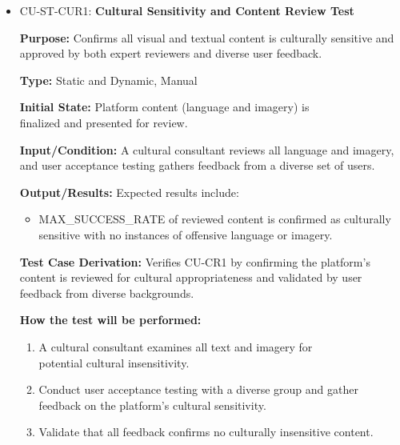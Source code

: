 \documentclass[12pt, titlepage]{article}
\begin{document}
\begin{itemize} 

  \item CU-ST-CUR1: \textbf{Cultural Sensitivity and Content Review Test}
  \begin{mdframed}[linewidth=0.5mm] 
    \textbf{Purpose:} Confirms all visual and textual content is culturally sensitive and approved by both expert reviewers and diverse user feedback. \par
    \textbf{Type:} Static and Dynamic, Manual \par 
    \textbf{Initial State:} Platform content (language and imagery) is \\finalized and presented for review. \par 
    \textbf{Input/Condition:} A cultural consultant reviews all language and imagery, and user acceptance testing gathers feedback from a diverse set of users. \par 
    \textbf{Output/Results:} Expected results include: 
    \begin{itemize} 
      \item MAX\_SUCCESS\_RATE of reviewed content is confirmed as culturally sensitive with no instances of offensive language or imagery. 
    \end{itemize} \par 
    \textbf{Test Case Derivation:} Verifies CU-CR1 by confirming the platform’s content is reviewed for cultural appropriateness and validated by user feedback from diverse backgrounds. \par 
    \textbf{How the test will be performed:} 
    \begin{enumerate}[noitemsep] 
      \item A cultural consultant examines all text and imagery for \\potential cultural insensitivity. 
      \item Conduct user acceptance testing with a diverse group and gather feedback on the platform's cultural sensitivity. 
      \item Validate that all feedback confirms no culturally insensitive content. 
    \end{enumerate} 
  \end{mdframed}


\end{itemize}
\end{document}
